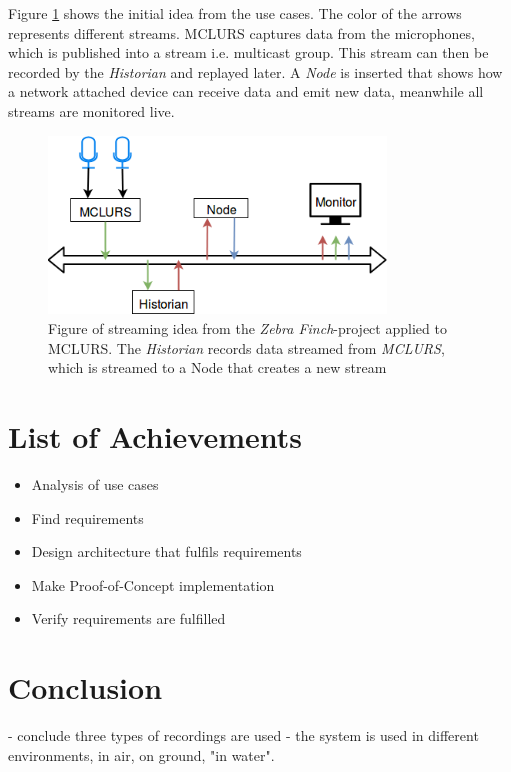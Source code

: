 \noindent Figure \ref{fig:streamingidea:idea} shows the initial idea from the use cases. The color of the arrows represents different streams. MCLURS captures data from the microphones, which is published into a stream i.e. multicast group. This stream can then be recorded by the \textit{Historian} and replayed later. A \textit{Node} is inserted that shows how a network attached device can receive data and emit new data, meanwhile all streams are monitored live.
\begin{figure}[H]
	\centering
	\includegraphics[width=0.8\textwidth]{figures/streaming_idea_all}
	\caption{Figure of streaming idea from the \textit{Zebra Finch}-project applied to MCLURS. The \textit{Historian} records data streamed from \textit{MCLURS}, which is streamed to a Node that creates a new stream} \label{fig:streamingidea:idea}
\end{figure}

\section{List of Achievements}
\begin{itemize}
	\item Analysis of use cases
	\item Find requirements
	\item Design architecture that fulfils requirements
	\item Make Proof-of-Concept implementation
	\item Verify requirements are fulfilled
\end{itemize}

\section{Conclusion}
- conclude three types of recordings are used
- the system is used in different environments, in air, on ground, "in water".
